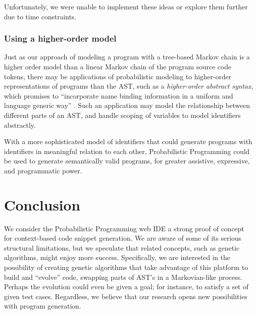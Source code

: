 \documentclass[titlepage]{article}
\begin{document}

Unfortunately, we were unable to implement these ideas or explore them further due to time constraints.

\subsubsection{Using a higher-order model}

Just as our approach of modeling a program with a tree-based Markov chain is a
higher order model than a linear Markov chain of the program source code tokens,
there may be applications of probabilistic modeling to higher-order
representations of programs than the AST, such as a \emph{higher-order abstract syntax}, which promises to ``incorporate name binding information in a uniform and language generic way'' \cite{hosa}. Such an application may model the relationship between different
parts of an AST, and handle scoping of variables to model identifiers
abstractly.

With a more sophisticated model of identifiers that could generate programs with
identifiers in meaningful relation to each other, Probabilistic Programming could
be used to generate semantically valid programs, for greater assistive,
expressive, and programmatic power.

\section{Conclusion}

We consider the Probabilistic Programming web IDE a strong proof of concept for context-based code snippet generation. We are aware of some of its serious structural limitations, but we speculate that related concepts, such as genetic algorithms, might enjoy more success. Specifically, we are interested in the possibility of creating genetic algorithms that take advantage of this platform to build and ``evolve'' code, swapping parts of AST's in a Markovian-like process. Perhaps the evolution could even be given a goal; for instance, to satisfy a set of given test cases. Regardless, we believe that our research opens new possibilities with program generation.
\end{document}
